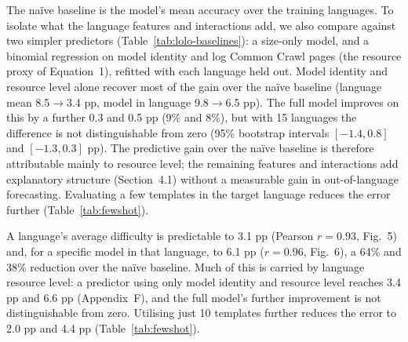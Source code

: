 The naïve baseline is the model's mean accuracy over the training languages. To isolate what the
language features and interactions add, we also compare against two simpler predictors
(Table~\ref{tab:lolo-baselines}): a size-only model, and a binomial regression on model identity and
log Common Crawl pages (the resource proxy of Equation~1), refitted with each language held out.
Model identity and resource level alone recover most of the gain over the naïve baseline (language
mean 8.5$\to$3.4 pp, model in language 9.8$\to$6.5 pp). The full model improves on this by a further
0.3 and 0.5 pp (9\% and 8\%), but with 15 languages the difference is not distinguishable from zero
(95\% bootstrap intervals $[-1.4, 0.8]$ and $[-1.3, 0.3]$ pp). The predictive gain over the naïve
baseline is therefore attributable mainly to resource level; the remaining features and interactions
add explanatory structure (Section~4.1) without a measurable gain in out-of-language forecasting.
Evaluating a few templates in the target language reduces the error further (Table~\ref{tab:fewshot}).

A language's average difficulty is predictable to 3.1 pp (Pearson $r = 0.93$, Fig.~5) and, for a
specific model in that language, to 6.1 pp ($r = 0.96$, Fig.~6), a 64\% and 38\% reduction over the
naïve baseline. Much of this is carried by language resource level: a predictor using only model
identity and resource level reaches 3.4 pp and 6.6 pp (Appendix~F), and the full model's further
improvement is not distinguishable from zero. Utilising just 10 templates further reduces the error to
2.0 pp and 4.4 pp (Table~\ref{tab:fewshot}).
